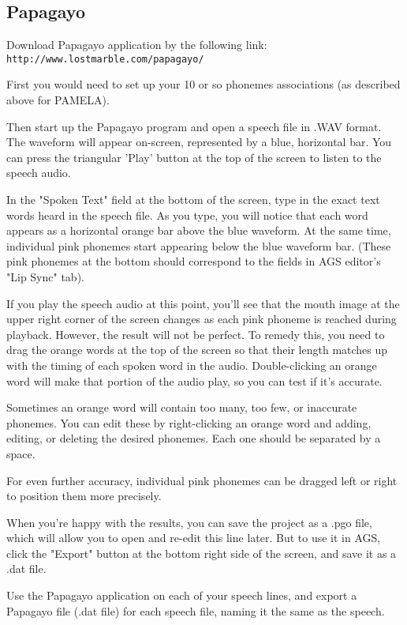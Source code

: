 \subsection{Papagayo}

Download Papagayo application by the following link:
\verb$http://www.lostmarble.com/papagayo/$

First you would need to set up your 10 or so phonemes associations (as described above for PAMELA).

Then start up the Papagayo program and open a speech file in .WAV format. The waveform will appear
on-screen, represented by a blue, horizontal bar. You can press the triangular 'Play' button
at the top of the screen to listen to the speech audio.

In the "Spoken Text" field at the bottom of the screen, type in the exact text words heard in the
speech file. As you type, you will notice that each word appears as a horizontal orange bar above
the blue waveform. At the same time, individual pink phonemes start appearing below
the blue waveform bar. (These pink phonemes at the bottom should correspond to the fields
in AGS editor's "Lip Sync" tab).

If you play the speech audio at this point, you'll see that the mouth image at the upper right
corner of the screen changes as each pink phoneme is reached during playback. However, the result
will not be perfect. To remedy this, you need to drag the orange words at the top of the screen
so that their length matches up with the timing of each spoken word in the audio.
Double-clicking an orange word will make that portion of the audio play, so you can test if it's accurate.

Sometimes an orange word will contain too many, too few, or inaccurate phonemes. You can edit these
by right-clicking an orange word and adding, editing, or deleting the desired phonemes.
Each one should be separated by a space.

For even further accuracy, individual pink phonemes can be dragged left or right to position them
more precisely.

When you're happy with the results, you can save the project as a .pgo file, which will allow you
to open and re-edit this line later. But to use it in AGS, click the "Export" button at the
bottom right side of the screen, and save it as a .dat file.

Use the Papagayo application on each of your speech lines, and export a Papagayo file (.dat file)
for each speech file, naming it the same as the speech.

